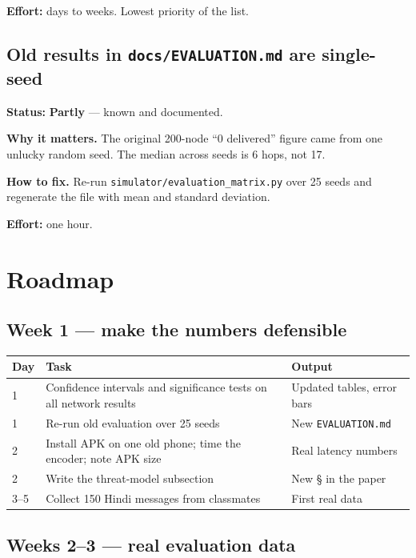 \documentclass[11pt,a4paper]{article}
\newcommand{\partly}{\textcolor{warn}{\textbf{Partly}}}
\begin{document}
\textbf{Effort:} days to weeks. Lowest priority of the list.

\subsection{Old results in \texttt{docs/EVALUATION.md} are single-seed}

\textbf{Status:} \partly{} --- known and documented.

\textbf{Why it matters.} The original 200-node ``0 delivered'' figure came from
one unlucky random seed. The median across seeds is 6 hops, not 17.

\textbf{How to fix.} Re-run \texttt{simulator/evaluation\_matrix.py} over 25
seeds and regenerate the file with mean and standard deviation.

\textbf{Effort:} one hour.

\section{Roadmap}

\subsection{Week 1 --- make the numbers defensible}

\begin{center}
\begin{tabular}{p{1.6cm} p{8.4cm} p{3.4cm}}
\toprule
\textbf{Day} & \textbf{Task} & \textbf{Output} \\
\midrule
1 & Confidence intervals and significance tests on all network results & Updated tables, error bars \\
1 & Re-run old evaluation over 25 seeds & New \texttt{EVALUATION.md} \\
2 & Install APK on one old phone; time the encoder; note APK size & Real latency numbers \\
2 & Write the threat-model subsection & New \S{} in the paper \\
3--5 & Collect 150 Hindi messages from classmates & First real data \\
\bottomrule
\end{tabular}
\end{center}

\subsection{Weeks 2--3 --- real evaluation data}
\end{document}
